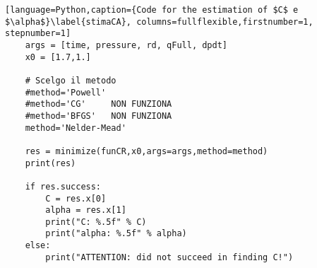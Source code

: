 \begin{lstlisting}[language=Python,caption={Code for the estimation of $C$ e $\alpha$}\label{stimaCA}, columns=fullflexible,firstnumber=1, stepnumber=1]
    args = [time, pressure, rd, qFull, dpdt]
    x0 = [1.7,1.]
    
    # Scelgo il metodo
    #method='Powell'
    #method='CG'     NON FUNZIONA
    #method='BFGS'   NON FUNZIONA
    method='Nelder-Mead'
    
    res = minimize(funCR,x0,args=args,method=method)
    print(res)
    
    if res.success:
        C = res.x[0]
        alpha = res.x[1]
        print("C: %.5f" % C)
        print("alpha: %.5f" % alpha)
    else:
        print("ATTENTION: did not succeed in finding C!")
\end{lstlisting}